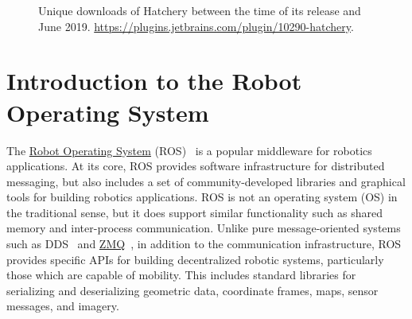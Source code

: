 \begin{figure}
    \centering
    \caption{Unique downloads of Hatchery between the time of its release and June 2019. \url{https://plugins.jetbrains.com/plugin/10290-hatchery}.}
    \label{fig:hatchery_downloads}
\end{figure}
%
\section{Introduction to the Robot Operating System}

The \href{https://www.ros.org/}{Robot Operating System} (ROS)~\citep{quigley2009ros} is a popular middleware for robotics applications. At its core, ROS provides software infrastructure for distributed messaging, but also includes a set of community-developed libraries and graphical tools for building robotics applications. ROS is not an operating system (OS) in the traditional sense, but it does support similar functionality such as shared memory and inter-process communication. Unlike pure message-oriented systems such as DDS~\citep{pardo2003omg} and \href{https://zeromq.org/}{ZMQ}~\citep{hintjens2013zeromq}, in addition to the communication infrastructure, ROS provides specific APIs for building decentralized robotic systems, particularly those which are capable of mobility. This includes standard libraries for serializing and deserializing geometric data, coordinate frames, maps, sensor messages, and imagery.

